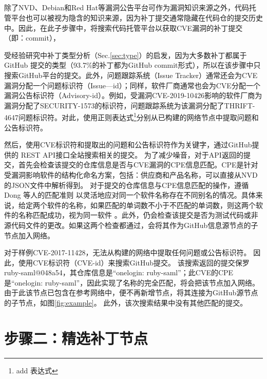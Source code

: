 \subsection{}
除了NVD、Debian和Red Hat等漏洞公告平台可作为漏洞知识来源之外，代码托管平台也可以被视为隐含的知识来源，因为补丁提交通常隐藏在代码仓的提交历史中。因此，在此子步骤中，\tool 将搜索代码托管平台以获取CVE漏洞的补丁提交（即：commit），

受经验研究中补丁类型分析（Sec.\ref{sec:type}）的启发，因为大多数补丁都属于 GitHub 提交的类型（93.7\%的补丁都为GitHub commit形式），所以在该步骤中\tool 只搜索GitHub平台的提交。此外，问题跟踪系统（Issue Tracker）通常还会为CVE漏洞分配一个问题标识符（Issue—id）；同样，软件厂商通常也会为CVE分配一个漏洞公告标识符（Advisory-id）。例如，受漏洞CVE-2019-10426影响的软件厂商为漏洞分配了SECURITY-1573\cite{SECURITY-1573}的标识符，问题跟踪系统为该漏洞分配了THRIFT-4647\cite{THRIFT-4647}问题标识符。对此，\tool 使用正则表达式\footnote{add 表达式}分别从已构建的网络节点中提取问题和公告标识符。

然后，\tool 使用CVE标识符和提取出的问题和公告标识符作为关键字，通过GitHub提供的 REST API\cite{github-api-1}接口全站搜索相关的提交。%
为了减少噪音，对于API返回的提交，\tool 首先会检查该提交的仓库信息是否与CVE漏洞的CPE信息匹配。CPE是针对受漏洞影响软件的结构化命名方案，包括：供应商和产品名称，可以直接从NVD的JSON文件中解析得到。
对于提交的仓库信息与CPE信息匹配的操作，\tool 遵循 Dong 等人的匹配准则 \cite{dong2019towards} 以灵活地应对同一个软件名称存在不同别名的情况。具体来说，给定两个软件的名称，如果匹配的单词数不小于不匹配的单词数，则这两个软件的名称匹配成功，视为同一软件 。此外，\tool 仍会检查该提交是否为测试代码或非源代码文件的更改。如果这两个检查都通过，\tool 会将其作为GitHub信息源节点的子节点加入网络。

\begin{exmp}
    对于样例CVE-2017-11428，\tool 无法从构建的网络中提取任何问题或公告标识符。 因此，\tool 使用CVE标识符（CVE-id）来搜索GitHub提交。 该搜索返回的提交保罗ruby-saml@048a54，其仓库信息是“onelogin: ruby-saml”；此CVE的CPE是“onelogin: ruby-saml”，因此实现了名称的完全匹配，\tool 将会把该节点加入网络。 由于此该节点已包含在参考网络中，\tool 便不再新增节点，将其连接为GitHub源节点的子节点，如图\ref{fig:example}。 此外，该次搜索结果中没有其他匹配的提交。
\end{exmp}   

\section{步骤二：精选补丁节点}\label{sec:selection}

